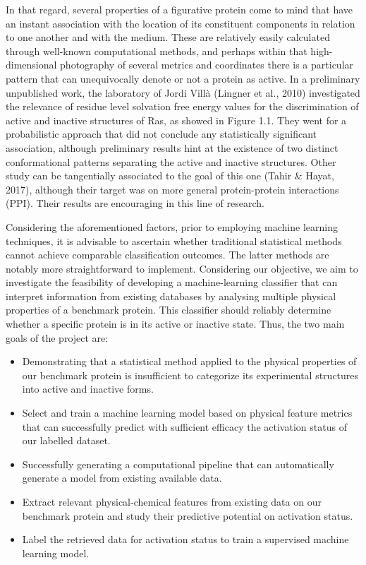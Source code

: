 \documentclass{article}
\begin{document}
In that regard, several properties of a figurative protein come to mind that have an instant association with the location of its constituent components in relation to one another and with the medium. These are relatively easily calculated through well-known computational methods, and perhaps within that high-dimensional photography of several metrics and coordinates there is a particular pattern that can unequivocally denote or not a protein as active. 
In a preliminary unpublished work, the laboratory of Jordi Villà (Lingner et al., 2010) investigated the relevance of residue level solvation free energy values for the discrimination of active and inactive structures of Ras, as showed in Figure 1.1.
They went for a probabilistic approach that did not conclude any statistically significant association, although preliminary results hint at the existence of two distinct conformational patterns separating the active and inactive structures. Other study can be tangentially associated to the goal of this one (Tahir \& Hayat, 2017), although their target was on more general protein-protein interactions (PPI). Their results are encouraging in this line of research.

Considering the aforementioned factors, prior to employing machine learning techniques, it is advisable to ascertain whether traditional statistical methods cannot achieve comparable classification outcomes. The latter methods are notably more straightforward to implement.
Considering our objective, we aim to investigate the feasibility of developing a machine-learning classifier that can interpret information from existing databases by analysing multiple physical properties of a benchmark protein. This classifier should reliably determine whether a specific protein is in its active or inactive state.
Thus, the two main goals of the project are:
\begin{itemize}
    \item Demonstrating that a statistical method applied to the physical properties of our benchmark protein is insufficient to categorize its experimental structures into active and inactive forms.
    \item Select and train a machine learning model based on physical feature metrics that can successfully predict with sufficient efficacy the activation status of our labelled dataset.

    \item Successfully generating a computational pipeline that can automatically generate a model from existing available data.
    \item Extract relevant physical-chemical features from existing data on our benchmark protein and study their predictive potential on activation status.
    \item Label the retrieved data for activation status to train a supervised machine learning model.


\end{itemize}
\end{document}
